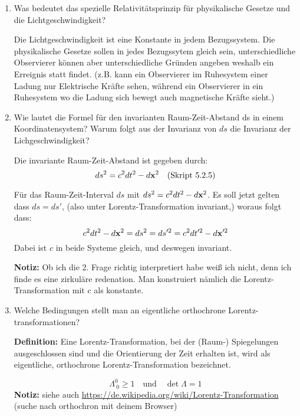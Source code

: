 \begin{enumerate}
  \item Was bedeutet das spezielle Relativitätsprinzip für physikalische
    Gesetze und die Lichtgeschwindigkeit?

    Die Lichtgeschwindigkeit ist eine Konstante in jedem Bezugssystem.
    Die physikalische Gesetze sollen in jedes Bezugssytem gleich sein,
    unterschiedliche Observierer können aber unterschiedliche Gründen
    angeben weshalb ein Erreignis statt findet. (z.B. kann ein Observierer
    im Ruhesystem einer Ladung nur Elektrische Kräfte sehen, während
    ein Observierer in ein Ruhesystem wo die Ladung sich bewegt auch
    magnetische Kräfte sieht.) 

  \item Wie lautet die Formel für den invarianten Raum-Zeit-Abstand ds in
    einem Koordinatensystem? Warum folgt aus der Invarianz von $ds$ die
    Invarianz der Lichgeschwindigkeit?
    
    Die invariante Raum-Zeit-Abstand ist gegeben durch:
    \begin{equation*}
      ds^2 = c^2 dt^2 - d\vb x^2
      \quad\text{(Skript 5.2.5)}
    \end{equation*}

      Für das Raum-Zeit-Interval $ds$ mit $ds^2=c^2dt^2-d\vb x^2$. Es soll
      jetzt gelten dass $ds=ds'$, (also unter Lorentz-Transformation 
      invariant,) woraus folgt dass:
      \begin{equation*}
        c^2dt^2-d\vb x^2 = ds^2 = ds'^2 = c^2dt'^2 - d\vb x'^2 
      \end{equation*}
      Dabei ist $c$ in beide Systeme gleich, und deswegen invariant.
      
      \textbf{Notiz:} Ob ich die 2. Frage richtig interpretiert habe
      weiß ich nicht, denn ich finde es eine zirkuläre redenation.
      Man konstruiert nämlich die Lorentz-Transformation mit c als
      konstante.

  \item Welche Bedingungen stellt man an eigentliche orthochrone
    Lorentz-transformationen?

    \textbf{Definition:} Eine Lorentz-Transformation, bei der (Raum-) 
    Spiegelungen 
    ausgeschlossen sind und die Orientierung der Zeit erhalten ist, 
    wird als eigentliche, orthochrone Lorentz-Transformation bezeichnet.

    \begin{equation*}
      \Lambda^{0}_{\ 0} \ge 1
      \quad \text{und}\quad
      \det \Lambda = 1
    \end{equation*}
    \textbf{Notiz:} siehe auch 
    \url{https://de.wikipedia.org/wiki/Lorentz-Transformation} (suche 
    nach orthochron mit deinem Browser)


\end{enumerate}
